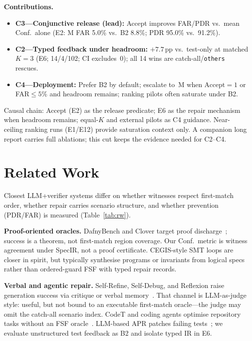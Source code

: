 \documentclass[10pt,conference]{IEEEtran}
\newcommand{\runin}[1]{\medskip\noindent\textbf{#1}\enspace}
\begin{document}
\runin{Contributions.}
\begin{itemize}
  \item \textbf{C3---Conjunctive release (lead):}
    Accept improves FAR/PDR vs.\ mean Conf.\ alone (E2: M FAR 5.0\% vs.\ B2
    8.8\%; PDR 95.0\% vs.\ 91.2\%).
  \item \textbf{C2---Typed feedback under headroom:}
    ${+}7.7$\,pp vs.\ test-only at matched $K{=}3$ (E6; 14/4/102; CI
    excludes~0); all 14 wins are catch-all/\texttt{others} rescues.
  \item \textbf{C4---Deployment:}
    Prefer B2 by default; escalate to~M when $\mathrm{Accept}{=}1$ or
    FAR${\le}5\%$ and headroom remains; ranking pilots often saturate under
    B2.
\end{itemize}
Causal chain: Accept (E2) as the release predicate; E6 as the repair mechanism
when headroom remains; equal-$K$ and external pilots as C4 guidance.
Near-ceiling ranking runs (E1/E12) provide saturation context only.
A companion long report carries full ablations; this cut keeps the evidence
needed for C2--C4.

\section{Related Work}
Closest LLM+verifier systems differ on whether witnesses respect first-match
order, whether repair carries scenario structure, and whether prevention
(PDR/FAR) is measured (Table~\ref{tab:rw}).

\runin{Proof-oriented oracles.}
DafnyBench and Clover target proof
discharge~\cite{loughridge2024dafnybench,sun2024clover}; success is a theorem,
not first-match region coverage.
Our Conf.\ metric is witness agreement under SpecIR, not a proof certificate.
CEGIS-style SMT loops are closer in spirit, but typically synthesise programs
or invariants from logical specs rather than ordered-guard FSF with typed
repair records.

\runin{Verbal and agentic repair.}
Self-Refine, Self-Debug, and Reflexion raise generation success via critique or
verbal memory~\cite{madaan2023selfrefine,chen2024selfdebug,shinn2023reflexion}.
That channel is LLM-as-judge style: useful, but not bound to an executable
first-match oracle---the judge may omit the catch-all scenario index.
CodeT and coding agents optimise repository tasks without an FSF
oracle~\cite{chen2023codet,wang2024opendevin,yang2024sweagent,xia2025agentless,jimenez2024swebench}.
LLM-based APR patches failing tests~\cite{xia2024chatrepair,jiang2023impact,legoues2019apr,bouzenia2024repairagent,fan2023llmrepair};
we evaluate unstructured test feedback as B2 and isolate typed IR in E6.
\end{document}
